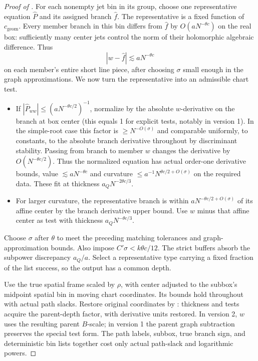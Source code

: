 \begin{proof}[Proof of ]
For each nonempty jet bin in its group, choose one representative
equation \(\widehat P\) and its assigned branch \(\hat f\).
The representative is a fixed function of \(c_{\mathrm{geom}}\).  Every member
branch in this bin differs from \(\hat f\) by
\(O(aN^{-\theta c})\) on the real box: sufficiently many center
jets control the norm of their holomorphic algebraic difference.
Thus
\[
 |w-\hat f|\lesssim aN^{-\theta c}
\]
on each member's entire short line piece, after choosing \(\sigma\)
small enough in the graph approximations.  We now turn the
representative into an admissible chart test.

\begin{itemize}
\item If \(|\widehat P_{ww}|\le (aN^{-\theta c/2})^{-1}\), normalize by the absolute \(w\)-derivative on the branch at box center (this equals 1 for explicit tests, notably in version 1). In the simple-root case this factor is \(\ge N^{-O(\sigma)}\) and comparable uniformly, to constants, to the absolute branch derivative throughout by discriminant stability. Passing from branch to member \(w\) changes the derivative by \(O(N^{-\theta c/2})\). Thus the normalized equation has actual order-one derivative bounds, value \(\lesssim aN^{-\theta c}\) and curvature \(\le a^{-1}N^{\theta c/2+O(\sigma)}\) on the required data. These fit at thickness \(a_Q N^{-2\theta c/3}\).
\item For larger curvature, the representative branch is within \(aN^{-\theta c/2+O(\sigma)}\) of its affine center by the branch derivative upper bound. Use \(w\) minus that affine center as test with thickness \(a_Q N^{-\theta c/3}\).

\end{itemize}
Choose \(\sigma\) after \(\theta\) to meet the preceding matching
tolerances and graph-approximation bounds.  Also impose
\(C'\sigma<k\theta c/12\).  The strict buffers absorb the
subpower discrepancy \(a_Q/a\).  Select a representative type
carrying a fixed fraction of the list success, so the output
has a common depth.

Use the true spatial frame scaled by \(\rho\), with center
adjusted to the subbox's midpoint spatial bin in moving chart
coordinates.  Its bounds hold throughout with actual path slacks.
Restore original coordinates by :
thickness and tests acquire the parent-depth factor, with derivative
units restored.  In version 2, \(w\) uses the resulting parent
\(B\)-scale; in version 1 the parent graph subtraction preserves
the special test form.  The path labels, subbox, true branch sign,
and deterministic bin lists together cost only actual path-slack
and logarithmic powers.


\end{proof}
